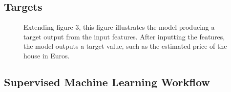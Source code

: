 \documentclass{article}
\begin{document}
\subsection{Targets}

\begin{figure}[H]
\centering
{}
    \caption{Extending figure 3, this figure illustrates the model producing a target output from the input features. After inputting the features, the model outputs a target value, such as the estimated price of the house in Euros.}
    \label{fig:regression_example}
\end{figure}

\subsection{Supervised Machine Learning Workflow}
\end{document}
